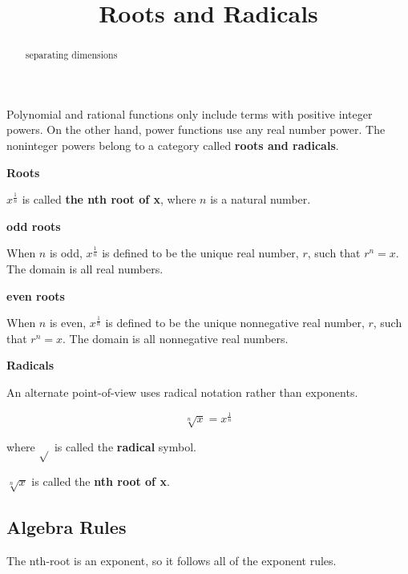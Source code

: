 \documentclass{ximera}
\title{Roots and Radicals}
\begin{document}
\begin{abstract}
separating dimensions
\end{abstract}
\maketitle


Polynomial and rational functions only include terms with positive integer powers. On the other hand, power functions use any real number power.  The noninteger powers belong to a category called \textbf{roots and radicals}.



\begin{definition} \textbf{\textcolor{green!50!black}{Roots}}

$x^{\tfrac{1}{n}}$ is called \textbf{the nth root of x}, where $n$ is a natural number.




\textbf{odd roots}

When $n$ is odd, $x^{\tfrac{1}{n}}$ is defined to be the unique real number, $r$, such that $r^n = x$. The domain is all real numbers.




\textbf{even roots}

When $n$ is even, $x^{\tfrac{1}{n}}$ is defined to be the unique nonnegative real number, $r$, such that $r^n = x$. The domain is all nonnegative real numbers.


\end{definition}



\begin{definition} \textbf{\textcolor{green!50!black}{Radicals}}

An alternate point-of-view uses radical notation rather than exponents.

\[   \sqrt[n]{x} =  x^{\tfrac{1}{n}}     \]

where $\sqrt{ }$ is called the \textbf{radical} symbol.


$\sqrt[n]{x}$ is called the \textbf{nth root of x}.

\end{definition}




\subsection*{Algebra Rules}

The nth-root is an exponent, so it follows all of the exponent rules.
\end{document}
